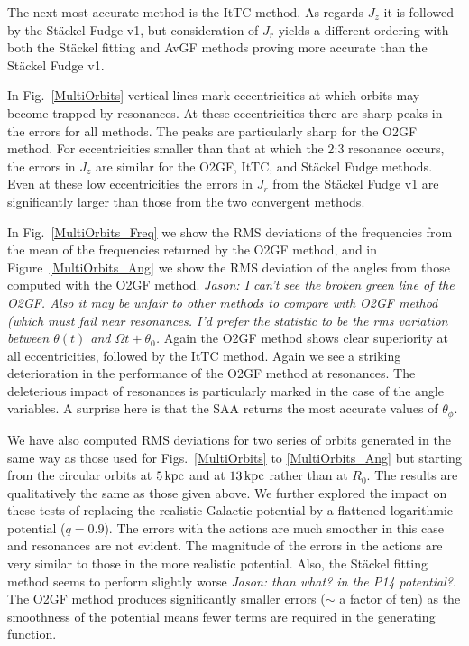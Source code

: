 \documentclass[useAMS,usenatbib,fleqn,a4paper]{mn2e}
\def\kpc{\,{\rm kpc}}
\begin{document}
The next most accurate method is the ItTC method. As regards $J_z$ it
is followed by the St\"ackel Fudge v1, but consideration of $J_r$ yields a
different ordering with both the St\"ackel fitting and AvGF methods
proving more accurate than the St\"ackel Fudge v1. 

In Fig.~\ref{MultiOrbits} vertical lines mark eccentricities at which
orbits may become trapped by resonances. At these eccentricities there are
sharp peaks in the errors for all methods. The peaks are particularly sharp
for the O2GF method. For eccentricities smaller than that at which the 2:3
resonance occurs, the errors in $J_z$ are similar for the O2GF, ItTC,
and St\"ackel Fudge methods. Even at these low eccentricities the errors in
$J_r$ from the St\"ackel Fudge v1 are significantly larger than those from
the two convergent methods.

In Fig.~\ref{MultiOrbits_Freq} we show the RMS deviations of the frequencies
from the mean of the frequencies returned by the O2GF method, and in
Figure~\ref{MultiOrbits_Ang} we show the RMS deviation of the angles from
those computed with the O2GF method. {\sl Jason: I can't see the broken green
line of the O2GF. Also it may be unfair to other methods to compare with O2GF
method (which must fail near resonances. I'd prefer the statistic to be the
rms variation between $\theta(t)$ and $\Omega t+\theta_0$.} Again the O2GF
method shows clear superiority at all eccentricities, followed by the
ItTC method. Again we see a striking deterioration in the performance
of the O2GF method at resonances. The deleterious impact of resonances is
particularly marked in the case of the angle variables. A surprise here is
that the SAA returns the most accurate values of $\theta_\phi$.

We have also computed RMS deviations for two series of orbits generated in
the same way as those used for Figs.~\ref{MultiOrbits} to
\ref{MultiOrbits_Ang} but starting from the circular orbits at $5\kpc$ and at
$13\kpc$ rather than at $R_0$. The results are qualitatively the same as
those given above.  We further explored the impact on these tests of
replacing the realistic Galactic potential by a flattened
logarithmic potential ($q=0.9$). The errors with the actions are much
smoother in this case and resonances are not evident. The magnitude of
the errors in the actions are very similar to those in the more realistic
potential. Also, the St\"ackel fitting method seems to perform slightly
worse {\sl Jason: than what? in the P14 potential?}. The O2GF method produces significantly smaller errors ($\sim$ a factor
of ten) as the smoothness of the potential means fewer terms  are
required in the generating function.
\end{document}
